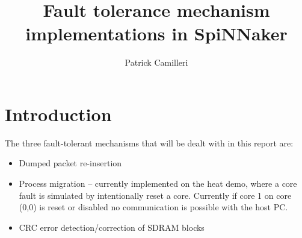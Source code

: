 \documentclass[a4paper, 11pt]{article}
\title{Fault tolerance mechanism implementations in SpiNNaker}
\author{Patrick Camilleri}
\date{}
\makeatletter
\newlength\drop
\newcommand*{\titleGM}{%
\thispagestyle{empty}
\begingroup%
\drop = 0.1\textheight
\vspace*{\baselineskip}
\vfill
\hbox{%
  \hspace*{0.2\textwidth}%
  \rule{1pt}{\dimexpr\textheight-28pt\relax}%
  \hspace*{0.05\textwidth}%
  \parbox[b]{0.75\textwidth}{%
    \vbox{%
      \vspace{\drop}
      {\Huge\bfseries\raggedright\@title\par}\vskip2.37\baselineskip
      {\Large\itshape PRiME Project }\\[4\baselineskip]
      {\Large\bfseries\@author\par}
      \vspace{0.5\textheight}
    }%
  }%
}%
\vfill
\cleardoublepage %
\null %
\endgroup}
\makeatother
\begin{document}
\maketitle


\tableofcontents


\newpage
\section{Introduction}
The three fault-tolerant mechanisms that will be dealt with in this report are:
\begin{itemize}
\item Dumped packet re-insertion
\item Process migration -- currently implemented on the heat demo, where a core fault is simulated by intentionally reset a core. Currently if core 1 on core (0,0) is reset or disabled no communication is possible with the host PC.
\item CRC error detection/correction of SDRAM blocks
\end{itemize}
	
\end{document}
